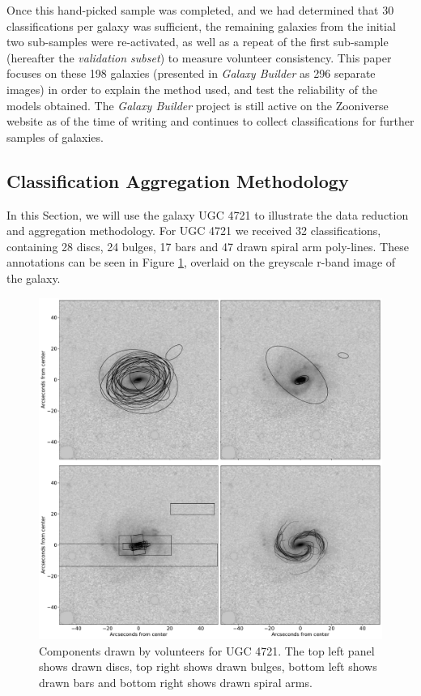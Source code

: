 \documentclass[../main.tex]{subfiles}
\begin{document}
Once this hand-picked sample was completed, and we had determined that 30 classifications per galaxy was sufficient, the remaining galaxies from the initial two sub-samples were re-activated, as well as a repeat of the first sub-sample (hereafter the \textit{validation subset}) to measure volunteer consistency. This paper focuses on these 198 galaxies (presented in \textit{Galaxy Builder} as 296 separate images) in order to explain the method used, and test the reliability of the models obtained. The \textit{Galaxy Builder} project is still active on the Zooniverse website as of the time of writing and continues to collect classifications for further samples of galaxies.

\subsection{Classification Aggregation Methodology}

In this Section, we will use the galaxy UGC 4721 to illustrate the data reduction and aggregation methodology. For UGC 4721 we received 32 classifications, containing 28 discs, 24 bulges, 17 bars and 47 drawn spiral arm poly-lines. These annotations can be seen in Figure \ref{fig:drawn_shapes}, overlaid on the greyscale r-band image of the galaxy.

\begin{figure}
  \includegraphics[width=17.3cm]{images__method/drawn_shapes.pdf}
  \caption{Components drawn by volunteers for UGC 4721. The top left panel shows drawn discs, top right shows drawn bulges, bottom left shows drawn bars and bottom right shows drawn spiral arms.}
  \label{fig:drawn_shapes}
\end{figure}
\end{document}
